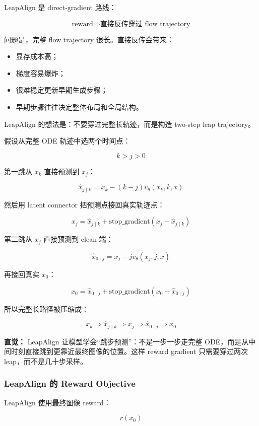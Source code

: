 LeapAlign 是 direct-gradient 路线：

\[
\text{reward}
\Rightarrow
\text{直接反传穿过 flow trajectory}
\]

问题是，完整 flow trajectory 很长。直接反传会带来：

\begin{itemize}[leftmargin=1.5em]
  \item 显存成本高；
  \item 梯度容易爆炸；
  \item 很难稳定更新早期生成步骤；
  \item 早期步骤往往决定整体布局和全局结构。
\end{itemize}

LeapAlign 的想法是：不要穿过完整长轨迹，而是构造 two-step leap trajectory。

假设从完整 ODE 轨迹中选两个时间点：

\[
k>j>0
\]

第一跳从 $x_k$ 直接预测到 $x_j$：

\[
\hat{x}_{j\mid k}
=
x_k
-
(k-j)
v_\theta(x_k,k,x)
\]

然后用 latent connector 把预测点接回真实轨迹点：

\[
x_j
=
\hat{x}_{j\mid k}
+
\text{stop\_gradient}
\left(
x_j-\hat{x}_{j\mid k}
\right)
\]

第二跳从 $x_j$ 直接预测到 clean 端：

\[
\hat{x}_{0\mid j}
=
x_j
-
j
v_\theta(x_j,j,x)
\]

再接回真实 $x_0$：

\[
x_0
=
\hat{x}_{0\mid j}
+
\text{stop\_gradient}
\left(
x_0-\hat{x}_{0\mid j}
\right)
\]

所以完整长路径被压缩成：

\[
x_k
\Rightarrow
\hat{x}_{j\mid k}
\Rightarrow
x_j
\Rightarrow
\hat{x}_{0\mid j}
\Rightarrow
x_0
\]

\begin{intubox}
\textbf{直觉：} LeapAlign 让模型学会“跳步预测”：不是一步一步走完整 ODE，而是从中间时刻直接跳到更靠近最终图像的位置。这样 reward gradient 只需要穿过两次 leap，而不是几十步采样。
\end{intubox}

\subsubsection{LeapAlign 的 Reward Objective}

LeapAlign 使用最终图像 reward：

\[
r(x_0)
\]

